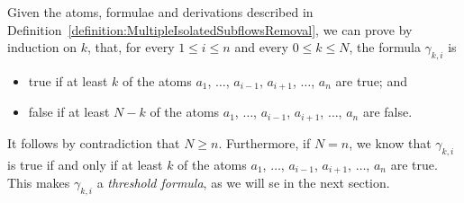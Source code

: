 \begin{remark}\label{remark:FromGammasToThresholds}
Given the atoms, formulae and derivations described in Definition~\ref{definition:MultipleIsolatedSubflowsRemoval}, we can prove by induction on $k$, that, for every $1\le i\le n$ and every $0\le k\le N$, the formula $\gamma_{k,i}$ is
\begin{itemize}
 \item true if at least $k$ of the atoms $a_1$, $\dots$, $a_{i-1}$, $a_{i+1}$, $\dots$, $a_n$ are true; and
 \item false if at least $N-k$ of the atoms $a_1$, $\dots$, $a_{i-1}$, $a_{i+1}$, $\dots$, $a_n$ are false.
\end{itemize}
It follows by contradiction that $N\ge n$. Furthermore, if $N=n$, we know that $\gamma_{k,i}$ is true if and only if at least $k$ of the atoms $a_1$, $\dots$, $a_{i-1}$, $a_{i+1}$, $\dots$, $a_n$ are true. This makes $\gamma_{k,i}$ a \emph{threshold formula}, as we will se in the next section.
\end{remark}

